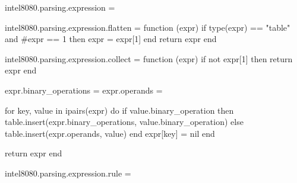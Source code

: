 intel8080.parsing.expression = {}

intel8080.parsing.expression.flatten = function (expr)
    if type(expr) == "table" and #expr == 1 then
        expr = expr[1]
    end
    return expr
end

intel8080.parsing.expression.collect = function (expr)
    if not expr[1] then return expr end

    expr.binary_operations = {}
    expr.operands = {}

    for key, value in ipairs(expr) do
        if value.binary_operation then
            table.insert(expr.binary_operations, value.binary_operation)
        else
            table.insert(expr.operands, value)
        end
        expr[key] = nil
    end

    return expr
end

intel8080.parsing.expression.rule =
